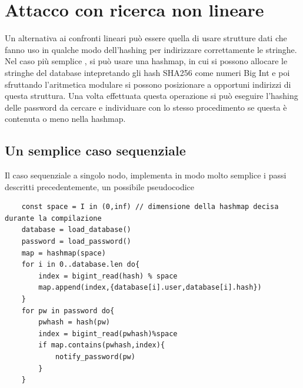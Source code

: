 \section{Attacco con ricerca non lineare}

Un alternativa ai confronti lineari può essere quella di usare strutture dati che fanno uso in qualche modo dell'hashing per indirizzare correttamente le stringhe. Nel caso più semplice , si può usare una hashmap, in cui si possono allocare le stringhe del database intepretando gli hash SHA256 come numeri Big Int e poi sfruttando l'aritmetica modulare si possono posizionare a opportuni indirizzi di questa struttura. Una volta effettuata questa operazione si può eseguire l'hashing delle password da cercare e individuare con lo stesso procedimento se questa è contenuta o meno nella hashmap. 

\subsection{Un semplice caso sequenziale}
Il caso sequenziale a singolo nodo, implementa in modo molto semplice i passi descritti precedentemente, un possibile pseudocodice 

\begin{lstlisting}
    const space = I in (0,inf) // dimensione della hashmap decisa durante la compilazione
    database = load_database()
    password = load_password()
    map = hashmap(space)
    for i in 0..database.len do{
        index = bigint_read(hash) % space 
        map.append(index,{database[i].user,database[i].hash})
    }
    for pw in password do{
        pwhash = hash(pw)
        index = bigint_read(pwhash)%space 
        if map.contains(pwhash,index){
            notify_password(pw)
        }
    }
\end{lstlisting}

